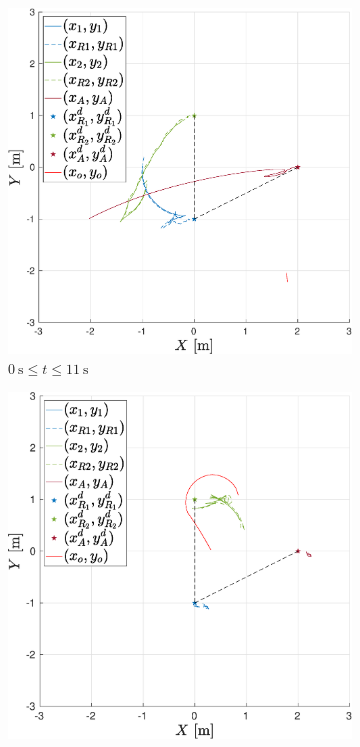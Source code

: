 \documentclass{ifacconf}
\begin{document}
\begin{figure}
    \centering
    \begin{subfigure}[b]{0.32\columnwidth}
        \centering
        \includegraphics[width=\linewidth]{images/experiment/dynamic_obstacles/dynamicObst_exp_far_bigger.eps}
         \caption{$\SI{0}{\second} \leq  t \leq \SI{11}{\second}$}
        \label{fig:exp_dynamicObstacles_1}
    \end{subfigure}
    \begin{subfigure}[b]{0.32\columnwidth}
        \centering
        \includegraphics[width=\linewidth]{images/experiment/dynamic_obstacles/dynamicObst_exp_closeR2_bigger.eps}

\end{subfigure}
\end{figure}
\end{document}

